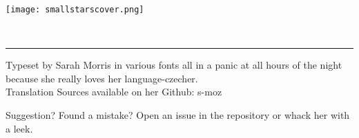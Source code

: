 \documentclass[a5paper,10pt]{memoir}
\begin{document}
\texttt{[image: smallstarscover.png]}

\vspace*{-100ex}  %

{\vspace*{2ex} \hspace{0.45\pagewidth} }\\

\vfill
\vspace*{80ex}  %
%
\onecolumn

{\color{cyan} \rule{\linewidth}{0.5mm}}

\vfill
%
Typeset by Sarah Morris in various fonts all in a panic at all hours of the night because she really loves her language-czecher.  \\
Translation Sources available on her Github: s-moz

% 
Suggestion? Found a mistake? Open an issue in the repository or whack her with a leek.
% 

\onecolumn
%
\end{document}

